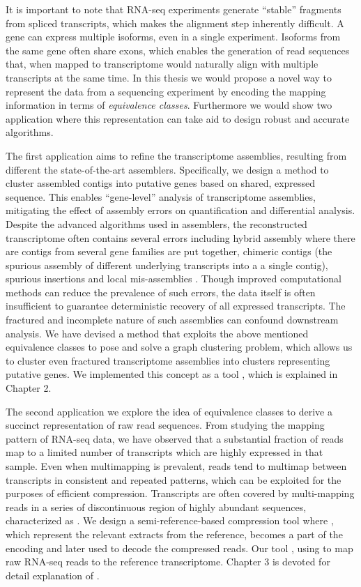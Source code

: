 It is important to note that RNA-seq experiments generate ``stable'' \citep{Chen2015} fragments from spliced transcripts, which makes the alignment step inherently difficult. A gene can express multiple isoforms, even in a single experiment. Isoforms from the same gene often share exons, which enables the generation of read sequences that, when mapped to transcriptome would naturally align with multiple transcripts at the same time. In this thesis we would propose a novel way to represent the data from a sequencing experiment by encoding the mapping information in terms of {\it equivalence classes}. Furthermore we would show two application where this representation can take aid to design robust and accurate algorithms. 

The first application aims to refine the \denovo transcriptome assemblies, resulting from different the state-of-the-art assemblers. Specifically, we design a method to cluster \denovo assembled contigs into putative genes based on shared, expressed sequence.  This enables ``gene-level'' analysis of \denovo transcriptome assemblies, mitigating the effect of assembly errors on quantification and differential analysis.  Despite the advanced algorithms used in assemblers, the reconstructed transcriptome often contains several errors including hybrid assembly where there are contigs from several gene families are put together, chimeric contigs (the spurious assembly of different underlying transcripts into a a single contig), spurious insertions and local mis-assemblies \citep{transrate}. Though improved computational methods can reduce the prevalence of such errors, the data itself is often insufficient to guarantee deterministic recovery of all expressed transcripts.  The fractured and incomplete nature of such \denovo assemblies can confound downstream analysis. We have devised a method that exploits the above mentioned equivalence classes to pose and solve a graph clustering problem, which allows us to cluster even fractured transcriptome assemblies into clusters representing putative genes. We implemented this concept as a tool \rapclust, which is explained in Chapter 2.

The second application we explore the idea of equivalence classes to derive a succinct representation of raw read sequences. From studying the mapping pattern of RNA-seq data, we have observed that a substantial fraction of reads map to a limited number of transcripts which are highly expressed in that sample. Even when multimapping is prevalent, reads tend to multimap between transcripts in consistent and repeated patterns, which can be exploited for the purposes of efficient compression. Transcripts are often covered by multi-mapping reads in a series of discontinuous region of highly abundant sequences, characterized as \islands. We design a semi-reference-based compression tool where \islands, which represent the relevant extracts from the reference, becomes a part of the encoding and later used to decode the compressed reads.
Our tool \quark, using \rapmap to map raw RNA-seq reads to the reference transcriptome. Chapter 3 is devoted for detail explanation of \quark. 

